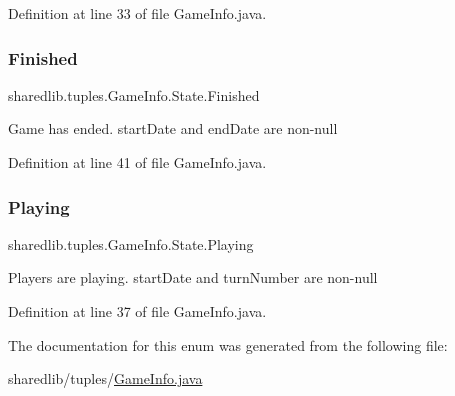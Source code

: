 Definition at line 33 of file Game\+Info.\+java.

\hypertarget{enumsharedlib_1_1tuples_1_1_game_info_1_1_state_af3bc3f542e250bbbb69103954d606f10}{}\label{enumsharedlib_1_1tuples_1_1_game_info_1_1_state_af3bc3f542e250bbbb69103954d606f10} 
\subsubsection{\texorpdfstring{Finished}{Finished}}
{\footnotesize\ttfamily sharedlib.\+tuples.\+Game\+Info.\+State.\+Finished}

Game has ended. start\+Date and end\+Date are non-\/null 

Definition at line 41 of file Game\+Info.\+java.

\hypertarget{enumsharedlib_1_1tuples_1_1_game_info_1_1_state_a2e21975e1bb9d5e7dd0c567be4fa8200}{}\label{enumsharedlib_1_1tuples_1_1_game_info_1_1_state_a2e21975e1bb9d5e7dd0c567be4fa8200} 
\subsubsection{\texorpdfstring{Playing}{Playing}}
{\footnotesize\ttfamily sharedlib.\+tuples.\+Game\+Info.\+State.\+Playing}

Players are playing. start\+Date and turn\+Number are non-\/null 

Definition at line 37 of file Game\+Info.\+java.



The documentation for this enum was generated from the following file\+:\begin{DoxyCompactItemize}
\item 
sharedlib/tuples/\hyperlink{_game_info_8java}{Game\+Info.\+java}\end{DoxyCompactItemize}
